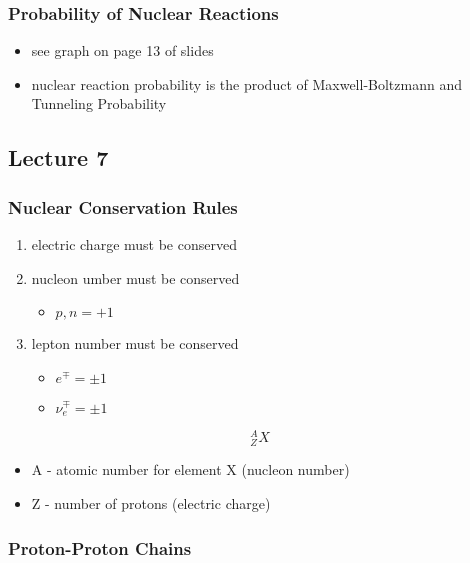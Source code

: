 \documentclass[a4paper,11pt,normalem]{article}
\begin{document}
\subsubsection{Probability of Nuclear
Reactions}\label{probability-of-nuclear-reactions}

\begin{itemize}
\item
  see graph on page 13 of slides
\item
  nuclear reaction probability is the product of Maxwell-Boltzmann and
  Tunneling Probability
\end{itemize}

\subsection{Lecture 7}\label{lecture-7}

\subsubsection{Nuclear Conservation
Rules}\label{nuclear-conservation-rules}

\begin{enumerate}
\def\labelenumi{\arabic{enumi}.}
\item
  electric charge must be conserved
\item
  nucleon umber must be conserved

  \begin{itemize}
  \item
    \(p, n = + 1\)
  \end{itemize}
\item
  lepton number must be conserved

  \begin{itemize}
  \item
    \(e^\mp = \pm 1\)
  \item
    \(\nu_{e}^\mp = \pm 1\)
  \end{itemize}
\end{enumerate}

\[
    ^{A}_{Z}X
\]

\begin{itemize}
\item
  A - atomic number for element X (nucleon number)
\item
  Z - number of protons (electric charge)
\end{itemize}

\subsubsection{Proton-Proton Chains}\label{proton-proton-chains}
\end{document}
